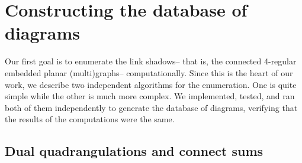 \documentclass[amsmath,secnumarabic,floatfix,amssymb,nofootinbib,nobibnotes,letterpaper,11pt,tightenlines,showkeys]{revtex4}
\theoremstyle{definition}
\begin{document}
\section{Constructing the database of diagrams}

Our first goal is to enumerate the link shadows-- that is, the connected 4-regular embedded planar (multi)graphs-- computationally. Since this is the heart of our work, we describe two independent algorithms for the enumeration. One is quite simple while the other is much more complex. We implemented, tested, and ran both of them independently to generate the database of diagrams, verifying that the results of the computations were the same.

\subsection{Dual quadrangulations and connect sums}
\end{document}
